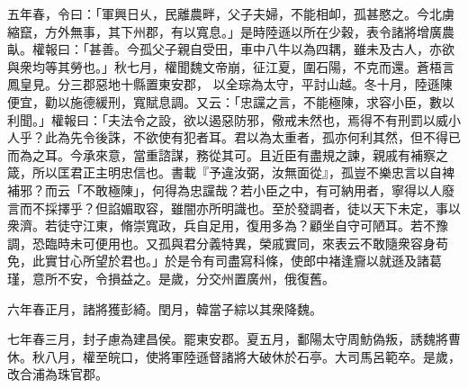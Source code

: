 \begin{pinyinscope}
 
五年春，令曰：「軍興日乆，民離農畔，父子夫婦，不能相卹，孤甚愍之。今北虜縮竄，方外無事，其下州郡，有以寬息。」是時陸遜以所在少穀，表令諸將增廣農畒。權報曰：「甚善。今孤父子親自受田，車中八牛以為四耦，雖未及古人，亦欲與衆均等其勞也。」秋七月，權聞魏文帝崩，征江夏，圍石陽，不克而還。蒼梧言鳳皇見。分三郡惡地十縣置東安郡，
 以全琮為太守，平討山越。冬十月，陸遜陳便宜，勸以施德緩刑，寬賦息調。又云：「忠讜之言，不能極陳，求容小臣，數以利聞。」權報曰：「夫法令之設，欲以遏惡防邪，儆戒未然也，焉得不有刑罰以威小人乎？此為先令後誅，不欲使有犯者耳。君以為太重者，孤亦何利其然，但不得已而為之耳。今承來意，當重諮謀，務從其可。且近臣有盡規之諫，親戚有補察之箴，所以匡君正主明忠信也。書載『予違汝弼，汝無面從』，孤豈不樂忠言以自裨補邪？而云「不敢極陳」，何得為忠讜哉？若小臣之中，有可納用者，寧得以人廢言而不採擇乎？但諂媚取容，雖闇亦所明識也。至於發調者，徒以天下未定，事以衆濟。若徒守江東，脩崇寬政，兵自足用，復用多為？顧坐自守可陋耳。若不豫調，恐臨時未可便用也。又孤與君分義特異，榮戚實同，來表云不敢隨衆容身苟免，此實甘心所望於君也。」於是令有司盡寫科條，使郎中褚逢齎以就遜及諸葛瑾，意所不安，令損益之。是歲，分交州置廣州，俄復舊。
 
 
 
 
 六年春正月，諸將獲彭綺。閏月，韓當子綜以其衆降魏。
 
 
七年春三月，封子慮為建昌侯。罷東安郡。夏五月，鄱陽太守周魴偽叛，誘魏將曹休。秋八月，權至皖口，使將軍陸遜督諸將大破休於石亭。大司馬呂範卒。是歲，改合浦為珠官郡。
 

\end{pinyinscope}
